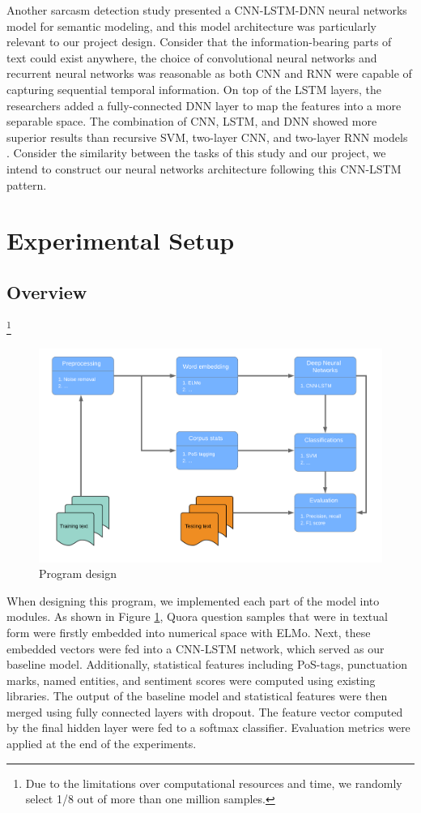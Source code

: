 \documentclass[12pt]{diazessay} %
\begin{document}
{Another sarcasm detection study \citep{ghosh2016} presented a CNN-LSTM-DNN neural networks model for semantic modeling, and this model architecture was particularly relevant to our project design. Consider that the information-bearing parts of text could exist anywhere, the choice of convolutional neural networks and recurrent neural networks was reasonable as both CNN and RNN were capable of capturing sequential temporal information. On top of the LSTM layers, the researchers added a fully-connected DNN layer to map the features into a more separable space. The combination of CNN, LSTM, and DNN showed more superior results than recursive SVM, two-layer CNN, and two-layer RNN models \citep{ghosh2016}. Consider the similarity between the tasks of this study and our project, we intend to construct our neural networks architecture following this CNN-LSTM pattern. 

\section{Experimental Setup}

\subsection{Overview}\footnote{
	Due to the limitations over computational resources and time, we randomly select 1/8 out of more than one million samples. 
}
\begin{figure}[ht]
	\includegraphics[width=0.6\textheight, center]{graphs/program_desi_flow.png}
	\caption{Program design}
	\label{figure:program_design}
\end{figure}
When designing this program, we implemented each part of the model into modules. As shown in Figure \ref{figure:program_design}, Quora question samples that were in textual form were firstly embedded into numerical space with ELMo. Next, these embedded vectors were fed into a CNN-LSTM network, which served as our baseline model. Additionally, statistical features including PoS-tags, punctuation marks, named entities, and sentiment scores were computed using existing libraries. The output of the baseline model and statistical features were then merged using fully connected layers with dropout. The feature vector computed by the final hidden layer were fed to a softmax classifier. Evaluation metrics were applied at the end of the experiments.

}
\end{document}
